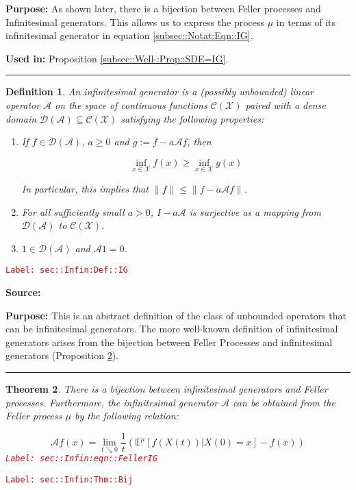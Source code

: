 \documentclass[12pt]{article}
\newcommand{\mb}{\mathbb}
\newcommand{\mc}{\mathcal}
\newcommand{\tr}{\textcolor{red}}
\newcommand{\labe}[1]{\tr{\texttt{Label: #1}}}
\newcommand{\purpose}{\textbf{Purpose: }}
\newcommand{\usein}{\textbf{Used in: }}
\newcommand{\lin}{\rule{\linewidth}{0.4 pt}}
\newcommand{\exmu}[2]{\mb{E}^{#1}\left[#2\right]}	%
\newcommand{\x}{x}								%
\renewcommand{\t}{t}							%
\newcommand{\X}{X}								%
\newcommand{\IG}{\mc{A}}						%
\newcommand{\tp}[1]{(#1)}						%
\newcommand{\core}{\mc{D}}						%
\newcommand{\cont}{\mc{C}}						%
\newcommand{\m}{\mu}							%
\newcommand{\spce}{\mc{X}}						%
\newtheorem{thms}{Theorem}[section]
\newtheorem{defn}[thms]{Definition}
\begin{document}
\purpose As shown later, there is a bijection between Feller processes and Infinitesimal generators. This allows us to express the process \(\mu\) in terms of its infinitesimal generator in equation \eqref{subsec::Notat:Eqn::IG}.

\usein Proposition \ref{subsec::Well-:Prop::SDE=IG}.

\lin

\begin{defn}
An infinitesimal generator is a (possibly unbounded) linear operator \(\IG\) on the space of continuous functions \(\cont(\spce)\) paired with a dense domain \(\core(\IG) \subseteq \cont(\spce)\) satisfying the following properties:

\begin{enumerate}
\item If \(f \in \mc{D}(\IG)\), \(a \geq 0\) and \(g:= f - a\IG f\), then 

\[\inf_{\x \in \spce} f(\x) \geq \inf_{\x \in \spce} g(\x)\]

\noindent In particular, this implies that \(\|f\| \leq \|f - a\IG f\|\).

\item For all sufficiently small \(a > 0\), \(I - a\IG\) is surjective as a mapping from \(\mc{D}(\IG)\) to \(\cont(\spce)\).

\item \(1 \in \core(\IG)\) and \(\IG 1 = 0\).
\end{enumerate}
\label{sec::Infin:Def::IG}
\end{defn}
\labe{sec::Infin:Def::IG}

\textbf{Source: }\cite[Definitions 2.1,2.7]{Lig85}

\purpose This is an abstract definition of the class of unbounded operators that can be infinitesimal generators. The more well-known definition of infinitesimal generators arises from the bijection between Feller Processes and infinitesimal generators (Proposition \ref{sec::Infin:Thm::Bij}).

\lin

\begin{thms}
There is a bijection between infinitesimal generators and Feller processes. Furthermore, the infinitesimal generator \(\IG\) can be obtained from the Feller process \(\m\) by the following relation:

\begin{equation}
\IG f(\x) = \lim_{\t\searrow 0} \frac{1}{\t}\left(\exmu{\m}{f(\X\tp{\t})|\X\tp{0}=\x} - f(\x)\right)
\label{sec::Infin:eqn::FellerIG}
\end{equation}
\labe{sec::Infin:eqn::FellerIG}
\label{sec::Infin:Thm::Bij}
\end{thms}
\labe{sec::Infin:Thm::Bij}
\end{document}
